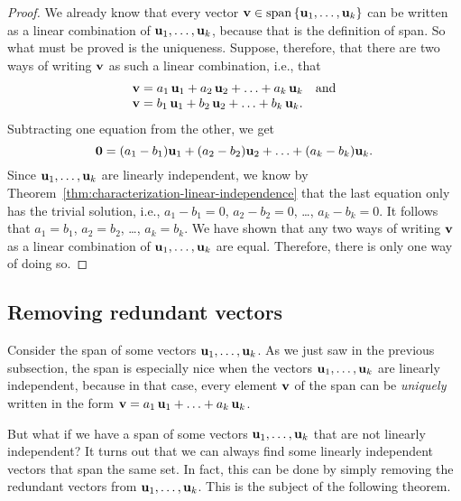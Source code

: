 \begin{proof}
  We already know that every vector
  $\vect{v}\in\sspan\set{\vect{u}_1,\ldots,\vect{u}_k}$ can be written
  as a linear combination of $\mbox{\bf u}_1,\ldots,\mbox{\bf u}_k$, because
  that is the definition of span. So what must be proved is the
  uniqueness. Suppose, therefore, that there are two ways of writing
  $\mbox{\bf v}$ as such a linear combination, i.e., that
  \begin{equation*}
    \begin{array}{l}
    \mbox{\bf v} = a_1\,\mbox{\bf u}_1 + a_2\,\mbox{\bf u}_2 + \ldots + a_k\,\mbox{\bf u}_k\quad\mbox{and}\\
    \mbox{\bf v} = b_1\,\mbox{\bf u}_1 + b_2\,\mbox{\bf u}_2 + \ldots + b_k\,\mbox{\bf u}_k.\\
    \end{array}
  \end{equation*}
  Subtracting one equation from the other, we get
  \begin{equation*}
    \mbox{\bf 0} = (a_1-b_1)\mbox{\bf u}_1 + (a_2-b_2)\mbox{\bf u}_2 + \ldots + (a_k-b_k)\mbox{\bf u}_k.
  \end{equation*}
  Since $\mbox{\bf u}_1,\ldots,\mbox{\bf u}_k$ are linearly independent, we
  know by Theorem~\ref{thm:characterization-linear-independence} that
  the last equation only has the trivial solution, i.e., $a_1-b_1=0$,
  $a_2-b_2=0$, \ldots, $a_k-b_k=0$. It follows that $a_1=b_1$,
  $a_2=b_2$, \ldots, $a_k=b_k$. We have shown that any two ways of
  writing $\mbox{\bf v}$ as a linear combination of
  $\mbox{\bf u}_1,\ldots,\mbox{\bf u}_k$ are equal. Therefore, there is only
  one way of doing so.
\end{proof}

\subsection{Removing redundant vectors}

Consider the span of some vectors $\mbox{\bf u}_1,\ldots,\mbox{\bf u}_k$. As
we just saw in the previous subsection, the span is especially nice
when the vectors $\mbox{\bf u}_1,\ldots,\mbox{\bf u}_k$ are linearly
independent, because in that case, every element $\mbox{\bf v}$ of the
span can be {\em uniquely} written in the form
$\mbox{\bf v} = a_1\,\mbox{\bf u}_1 + \ldots + a_k\,\mbox{\bf u}_k$.

But what if we have a span of some vectors
$\mbox{\bf u}_1,\ldots,\mbox{\bf u}_k$ that are not linearly independent? It
turns out that we can always find some linearly independent vectors
that span the same set.  In fact, this can be done by simply removing
the redundant vectors from $\mbox{\bf u}_1,\ldots,\mbox{\bf u}_k$. This is the
subject of the following theorem.


